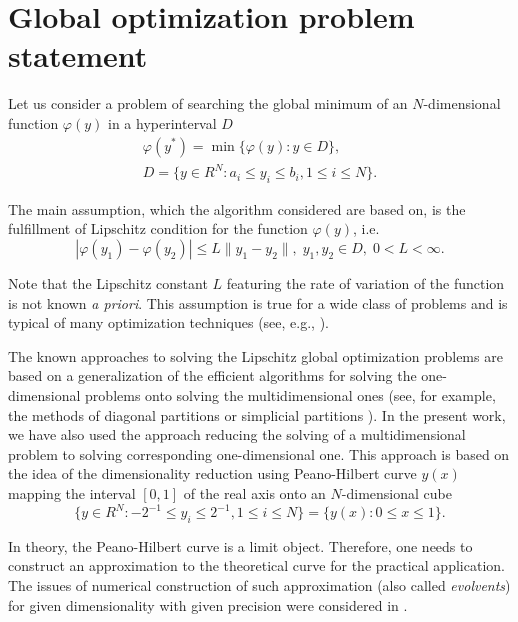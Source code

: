 \documentclass[runningheads]{llncs}
\begin{document}
\section{Global optimization problem statement}\label{sec:problem}

Let us consider a problem of searching the global minimum of an $N$-dimensional function $\varphi(y)$ in a hyperinterval $D$
\begin{gather}
\varphi(y^*) = \min{\{ \varphi(y):y \in D \}}, \label{problemN} \\ 
D = \{ y \in R^{N}: a_i \leq y_i \leq b_i, 1 \leq i \leq N \}. \label{D}
\end{gather}

The main assumption, which the algorithm considered are based on, is the fulfillment of Lipschitz condition for the function $\varphi(y)$, i.e.
\begin{equation} \label{lip_ref}
\left| \varphi(y_1) - \varphi(y_2) \right| \leq L\|y_1 - y_2\|, \; y_1, y_2 \in D, \; 0 < L < \infty.
\end{equation}

Note that the Lipschitz constant $L$ featuring the rate of variation of the function is not known \textit{a priori}. This assumption is true for a wide class of problems and is typical of many optimization techniques (see, e.g., \cite{Evtushenko2013,Jones2009,Paulavicius2014}).

The known approaches to solving the Lipschitz global optimization problems are based on a generalization of the efficient algorithms for solving the one-dimensional problems onto solving the multidimensional ones (see, for example, the methods of diagonal partitions \cite{Sergeyev2017} or simplicial partitions \cite{PaulaviciusZilinskas2014}). In the present work, we have also used the approach reducing the solving of a multidimensional problem to solving corresponding one-dimensional one. This approach is based on the idea of the dimensionality reduction using Peano-Hilbert curve $y(x)$ mapping the interval $[0,1]$ of the real axis onto an $N$-dimensional cube 
\begin{equation} \label{n_dem_cube_ref}
\{ y \in R^{N}: -2^{-1} \leq y_i \leq 2^{-1}, 1 \leq i \leq N\} = \{y(x): 0 \leq x \leq 1 \}.
\end{equation}

In theory, the Peano-Hilbert curve is a limit object. Therefore, one needs to construct an approximation to the theoretical curve for the practical application. The issues of numerical construction of such approximation (also called \textit{evolvents}) for given dimensionality with given precision were considered in \cite{Sergeyev2013}.
\end{document}
